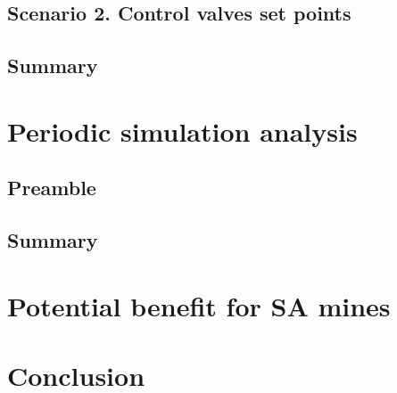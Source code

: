	\subsection{Scenario 2. Control valves set points}
	\subsection{Summary}
\section{Periodic simulation analysis}
	\subsection{Preamble}
	\subsection{Summary}
\section{Potential benefit for SA mines}
\section{Conclusion}